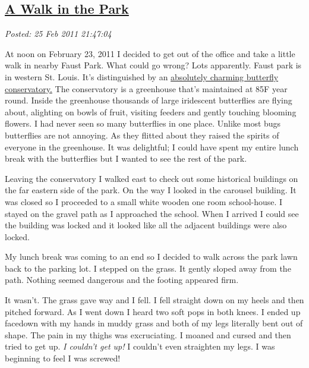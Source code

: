 %

\subsection*{\href{http://bakerjd99.wordpress.com/2011/02/25/a-walk-in-the-park/}{A Walk in the Park}}


\noindent\emph{Posted: 25 Feb 2011 21:47:04}
\vspace{6pt}

At noon on February 23, 2011 I decided to get out of the office and take
a little walk in nearby Faust Park. What could go wrong? Lots
apparently. Faust park is in western St. Louis. It's distinguished by an
\href{http://www.butterflyhouse.org/}{absolutely charming butterfly
conservatory.} The conservatory is a greenhouse that's maintained at 85F
year round. Inside the greenhouse thousands of large iridescent
butterflies are flying about, alighting on bowls of fruit, visiting
feeders and gently touching blooming flowers. I had never seen so many
butterflies in one place. Unlike most bugs butterflies are not annoying.
As they flitted about they raised the spirits of everyone in the
greenhouse. It was delightful; I could have spent my entire lunch break
with the butterflies but I wanted to see the rest of the park.

Leaving the conservatory I walked east to check out some historical
buildings on the far eastern side of the park. On the way I looked in
the carousel building. It was closed so I proceeded to a small white
wooden one room school-house. I stayed on the gravel path as I
approached the school. When I arrived I could see the building was
locked and it looked like all the adjacent buildings were also locked.

My lunch break was coming to an end so I decided to walk across the park
lawn back to the parking lot. I stepped on the grass. It gently sloped
away from the path. Nothing seemed dangerous and the footing appeared
firm.

It wasn't. The grass gave way and I fell. I fell straight down on my
heels and then pitched forward. As I went down I heard two soft pops in
both knees. I ended up facedown with my hands in muddy grass and both of
my legs literally bent out of shape. The pain in my thighs was
excruciating. I moaned and cursed and then tried to get up. \emph{I
couldn't get up!} I couldn't even straighten my legs. I was beginning to
feel I was screwed!


